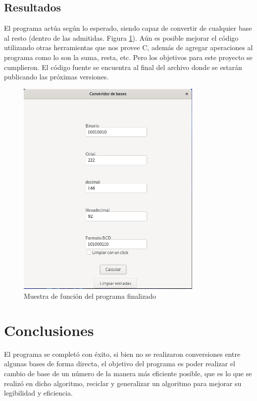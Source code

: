 \documentclass[letterpaper,12pt]{extarticle}%
\begin{document}
\begin{multicols}{2}
	\renewcommand{\labelenumi}{\arabic{enumi}.}
    
    	
    \section{Resultados}
		El programa actúa según lo esperado, siendo capaz de convertir de cualquier base al resto (dentro de las admitidas. Figura \ref{programFuntion}).
		Aún es posible mejorar el código utilizando otras herramientas que nos provee C, además de agregar aperaciones al programa
		como lo son la suma, resta, etc. Pero los objetivos para este proyecto se cumplieron. El código fuente se encuentra al final del archivo donde se
		estarán publicando las próximas versiones.		
		\begin{figure}[H]
		\begin{center}
		\includegraphics[width=9cm]{imag//programFuntion.png}
		\caption{Muestra de función del programa finalizado}
		\label{programFuntion}
		\end{center}
		\end{figure}

	    \end{multicols}
	    \section{Conclusiones}
		El programa se completó con éxito, si bien no se realizaron conversiones entre algunas bases
		de forma directa, el objetivo del programa es poder realizar el cambio de base de un número de
		la manera más eficiente posible, que es lo que se realizó en dicho algoritmo, reciclar y generalizar
		un algoritmo para mejorar su legibilidad y eficiencia.
		
\end{document}
